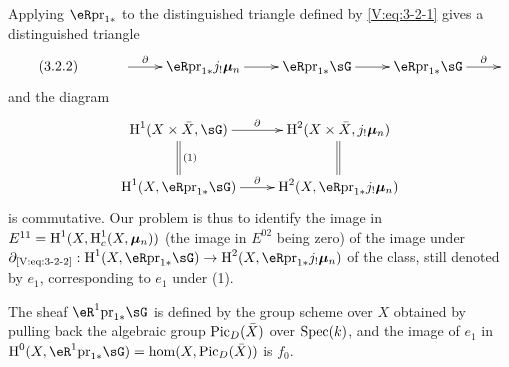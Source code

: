 Applying $\eR\pr_{1\ast}$ to the distinguished triangle defined by
\eqref{V:eq:3-2-1} gives a distinguished triangle
\begin{equation*}\tag{3.2.2}\label{V:eq:3-2-2}
\xymatrix{
  & \ar[r]^-\partial
    & \eR \pr_{1\ast} j_!\dmu_n \ar[r]
    & \eR \pr_{1\ast}\sG \ar[r]
    & \eR \pr_{1\ast}\sG \ar[r]^-\partial
    &
}
\end{equation*}
and the diagram
\[\xymatrix{
  \h^1(X\times \bar X,\sG) \ar[r]^-\partial \ar@{=}[d]^-{(1)}
    & \h^2(X\times \bar X,j_!\dmu_n) \ar@{=}[d] \\
  \h^1(X,\eR\pr_{1\ast} \sG) \ar[r]^-\partial
    & \h^2(X,\eR\pr_{1\ast} j_!\dmu_n)
}\]
is commutative. Our problem is thus to identify the image in
$E^{11}=\operatorname{H}^1(X,\operatorname{H}_c^1(X,{\bm\mu}_n))$ (the image in $E^{02}$ being zero) of the
image under
$\partial_{\text{\eqref{V:eq:3-2-2}}}:\h^1(X,\eR\pr_{1\ast}\sG) \to \h^2(X,\eR\pr_{1\ast} j_!\dmu_n)$
of the class, still denoted by $e_1$, corresponding to $e_1$ under (1).

The sheaf $\eR^1\pr_{1\ast}\sG$ is defined by the group scheme over $X$
obtained by pulling back the algebraic group $\operatorname{Pic}_D(\bar X)$ over
$\operatorname{Spec}(k)$, and the image of $e_1$ in
$\h^0(X,\eR^1\pr_{1\ast}\sG) = \hom(X,\pic_D(\bar X))$ is $f_0$.

